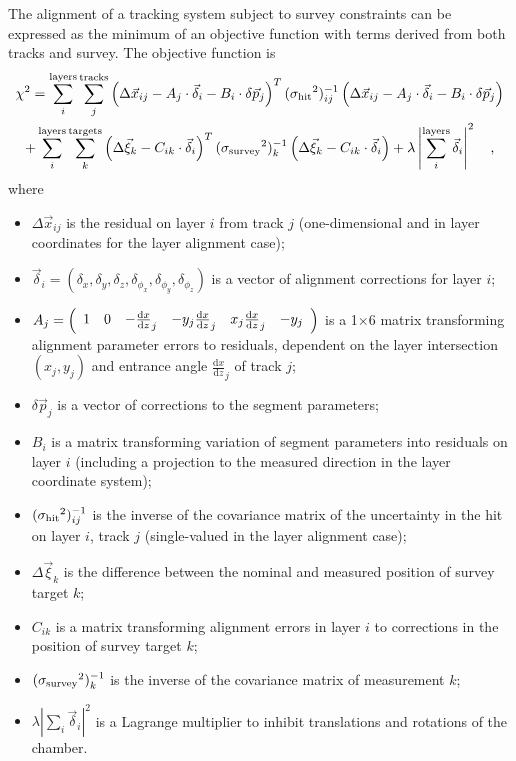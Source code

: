 The alignment of a tracking system subject to survey constraints can
be expressed as the minimum of an objective function with terms
derived from both tracks and survey.  The objective function is
\begin{multline}
\chi^2 = \sum_i^{\mbox{\scriptsize layers}} \sum_j^{\mbox{\scriptsize tracks}}
\left(\Delta \vec{x}_{ij} - A_j \cdot \vec{\delta}_i - B_i \cdot \delta \vec{p}_j\right)^T
({\sigma_{\mbox{\scriptsize hit}}}^2)_{ij}^{-1} \left(\Delta \vec{x}_{ij} - A_j \cdot \vec{\delta}_i - B_i \cdot \delta \vec{p}_j\right) \\
+ \sum_i^{\mbox{\scriptsize layers}} \sum_k^{\mbox{\scriptsize targets}}
\left(\Delta \vec{\xi}_k - C_{ik} \cdot \vec{\delta}_i\right)^T
({\sigma_{\mbox{\scriptsize survey}}}^2)_k^{-1}
\left(\Delta \vec{\xi}_k - C_{ik} \cdot \vec{\delta}_i\right)
+ \lambda \left|\sum_i^{\mbox{\scriptsize layers}} \vec{\delta}_i\right|^2 \quad\mbox{,}
\label{eqn:chi2millepede}
\end{multline}
where
\begin{itemize}
\item $\Delta \vec{x}_{ij}$ is the residual on layer $i$ from track $j$ (one-dimensional and in layer coordinates for the layer alignment case);
\item $\vec{\delta}_i =
(\delta_x, \delta_y, \delta_z, \delta_{\phi_x}, \delta_{\phi_y}, \delta_{\phi_z})$ is a vector of alignment corrections for layer $i$;
\item $A_j = \left(\begin{array}{c c c c c c} 1 & 0 & -\frac{\textrm{d}x}{\textrm{d}z}_j & -y_j \frac{\textrm{d}x}{\textrm{d}z}_j & x_j \frac{\textrm{d}x}{\textrm{d}z}_j & -y_j \end{array}\right)$ is a 1$\times$6 matrix transforming alignment parameter errors to residuals, dependent on the layer intersection $(x_j, y_j)$ and entrance angle $\frac{\textrm{d}x}{\textrm{d}z}_j$ of track $j$;
\item $\delta \vec{p}_j$ is a vector of corrections to the segment parameters;
\item $B_i$ is a matrix transforming variation of segment parameters
into residuals on layer $i$ (including a projection to the measured direction in the layer coordinate system);
\item $({\sigma_{\mbox{\scriptsize hit}}}^2)_{ij}^{-1}$ is the inverse
of the covariance matrix of the uncertainty in the hit on layer $i$,
track $j$ (single-valued in the layer alignment case);
\item $\Delta \vec{\xi}_k$ is the difference between the nominal and
measured position of survey target $k$;
\item $C_{ik}$ is a matrix transforming alignment errors in layer $i$ to corrections in the position of survey target $k$;
\item $({\sigma_{\mbox{\scriptsize survey}}}^2)_k^{-1}$ is the inverse
of the covariance matrix of measurement $k$;
\item $\lambda \left| \sum_i \vec{\delta}_i \right|^2$ is a Lagrange multiplier to inhibit translations
and rotations of the chamber.
\end{itemize}

